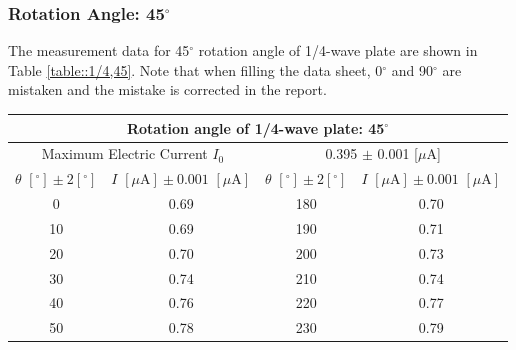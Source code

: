 \documentclass[a4paper]{article}
\begin{document}
\subsubsection{Rotation Angle: 45$^\circ$}

The measurement data for 45$^\circ$ rotation angle of 1/4-wave plate are shown in Table \ref{table::1/4,45}.  Note that when filling the data sheet, 0$^\circ$ and 90$^\circ$ are mistaken and the mistake is corrected in the report.

\begin{table}[H]
	\centering
	\begin{tabular}{cc||cc}
		\multicolumn{4}{c}{Rotation angle of 1/4-wave plate: 45$^\circ$}                                                                                                                            \\
		\hline
		\multicolumn{2}{c}{Maximum Electric Current $I_0$} & \multicolumn{2}{c}{0.395 $\pm$ 0.001 [$\mu$A]}                                                                                         \\
		\hline
		$\theta\,\,[^\circ] \pm 2[^\circ]$                 & $I\,\,[\mu\text{A}] \pm 0.001\,\,[\mu\text{A}]$ & $\theta\,\,[^\circ] \pm 2[^\circ]$ & $I\,\,[\mu\text{A}] \pm 0.001\,\,[\mu\text{A}]$ \\
		\hline
		0                                                  & 0.69                                            & 180                                & 0.70                                            \\
		10                                                 & 0.69                                            & 190                                & 0.71                                            \\
		20                                                 & 0.70                                            & 200                                & 0.73                                            \\
		30                                                 & 0.74                                            & 210                                & 0.74                                            \\
		40                                                 & 0.76                                            & 220                                & 0.77                                            \\
		50                                                 & 0.78                                            & 230                                & 0.79                                            \\

\end{tabular}
\end{table}
\end{document}
